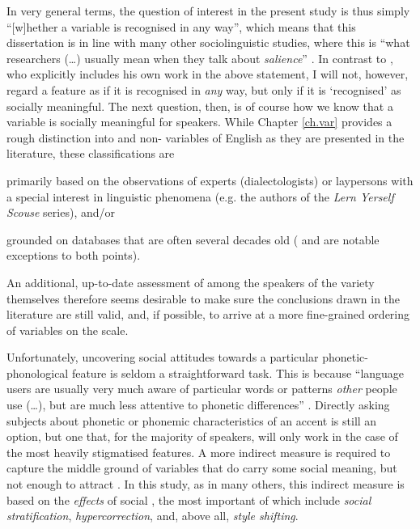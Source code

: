 In very general terms, the question of interest in the present study is thus simply ``[w]hether a variable is recognised in any way'', which means that this dissertation is in line with many other sociolinguistic studies, where this is ``what researchers (\dots) usually mean when they talk about \emph{salience}'' \parencite[4, emphasis in original]{racz2013}.
In contrast to \textcite{racz2013}, who explicitly includes his own work in the above statement, I will not, however, regard a feature as  if it is recognised in \emph{any} way, but only if it is `recognised' as socially meaningful.
The next question, then, is of course how we know that a variable is socially meaningful for speakers.
While Chapter \ref{ch.var} provides a rough distinction into  and non- variables of  English as they are presented in the literature, these classifications are
\begin{inparaenum}[(1)]
	\item primarily based on the observations of experts (dialectologists) or laypersons with a special interest in linguistic phenomena (e.g. the authors of the \emph{Lern Yerself Scouse} series), and/or
	\item grounded on databases that are often several decades old (\citealt{watsonclark2013} and \citealt{watsonclark2015} are notable exceptions to both points).
\end{inparaenum}
An additional, up-to-date assessment of  among the speakers of the variety themselves therefore seems desirable to make sure the conclusions drawn in the literature are still valid, and, if possible, to arrive at a more fine-grained ordering of variables on the  scale.

Unfortunately, uncovering social attitudes towards a particular phonetic-phonological feature is seldom a straightforward task.
This is because ``language users are usually very much aware of particular words or  patterns \emph{other} people use (\ldots), but are much less attentive to phonetic differences'' \parencite[3, emphasis in the original]{racz2013}.
Directly asking subjects about phonetic or phonemic characteristics of an accent is still an option, but one that, for the majority of speakers, will only work in the case of the most heavily stigmatised features.
A more indirect measure is required to capture the middle ground of variables that do carry some social meaning, but not enough to attract .
In this study, as in many others, this indirect measure is based on the \emph{effects} of social , the most important of which include \emph{social stratification}, \emph{hypercorrection}, and, above all, \emph{style shifting}.

